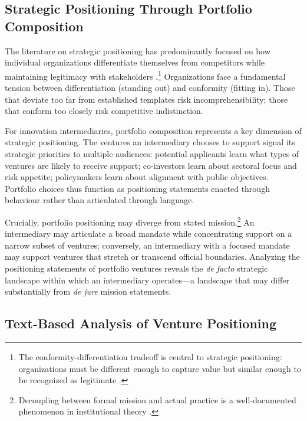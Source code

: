 \documentclass[../main.tex]{subfiles}
\begin{document}
\subsection{Strategic Positioning Through Portfolio Composition}

The literature on strategic positioning has predominantly focused on how individual organizations differentiate themselves from competitors while maintaining legitimacy with stakeholders \cite{porter1980competitive,deephouse1999same,porac1989competitive}.\footnote{The conformity-differentiation tradeoff is central to strategic positioning: organizations must be different enough to capture value but similar enough to be recognized as legitimate \cite{zhao2017optimal}.} Organizations face a fundamental tension between differentiation (standing out) and conformity (fitting in). Those that deviate too far from established templates risk incomprehensibility; those that conform too closely risk competitive indistinction.

For innovation intermediaries, portfolio composition represents a key dimension of strategic positioning. The ventures an intermediary chooses to support signal its strategic priorities to multiple audiences: potential applicants learn what types of ventures are likely to receive support; co-investors learn about sectoral focus and risk appetite; policymakers learn about alignment with public objectives. Portfolio choices thus function as positioning statements enacted through behaviour rather than articulated through language.

Crucially, portfolio positioning may diverge from stated mission.\footnote{Decoupling between formal mission and actual practice is a well-documented phenomenon in institutional theory \cite{meyer1977institutionalized}.} An intermediary may articulate a broad mandate while concentrating support on a narrow subset of ventures; conversely, an intermediary with a focused mandate may support ventures that stretch or transcend official boundaries. Analyzing the positioning statements of portfolio ventures reveals the \textit{de facto} strategic landscape within which an intermediary operates---a landscape that may differ substantially from \textit{de jure} mission statements.

\subsection{Text-Based Analysis of Venture Positioning}
\end{document}
